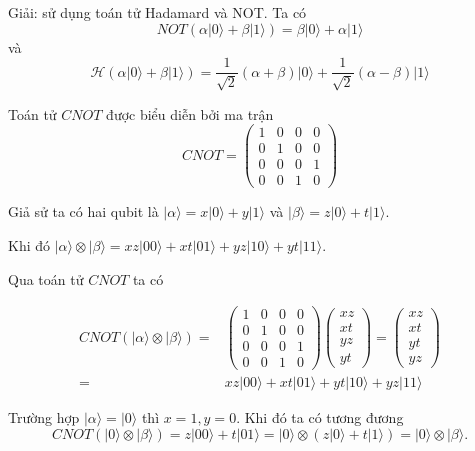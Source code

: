 Giải: sử dụng toán tử Hadamard và NOT. Ta có \[ NOT(\alpha \lvert 0 \rangle + \beta \lvert 1 \rangle) = \beta \lvert 0 \rangle + \alpha \lvert 1 \rangle\] và \[\mathcal{H} (\alpha \lvert 0 \rangle + \beta \lvert 1 \rangle) = \dfrac{1}{\sqrt{2}} (\alpha + \beta) \lvert 0 \rangle + \dfrac{1}{\sqrt{2}} (\alpha - \beta) \lvert 1 \rangle \]

Toán tử $CNOT$ được biểu diễn bởi ma trận \[ CNOT = \begin{pmatrix}
    1 & 0 & 0 & 0 \\ 0 & 1 & 0 & 0 \\ 0 & 0 & 0 & 1 \\ 0 & 0 & 1 & 0
\end{pmatrix}\]

Giả sử ta có hai qubit là $\lvert \alpha \rangle = x \lvert 0 \rangle + y \lvert 1 \rangle$ và $\lvert \beta \rangle = z \lvert 0 \rangle + t \lvert 1 \rangle$.

Khi đó $\lvert \alpha \rangle \otimes \lvert \beta \rangle = xz \lvert 00 \rangle + xt \lvert 01 \rangle + yz \lvert 10 \rangle + yt \lvert 11 \rangle$.

Qua toán tử $CNOT$ ta có

\begin{align*}
    CNOT (\lvert \alpha \rangle \otimes \lvert \beta \rangle) 
    = & \begin{pmatrix}
    1 & 0 & 0 & 0 \\ 0 & 1 & 0 & 0 \\ 0 & 0 & 0 & 1 \\ 0 & 0 & 1 & 0
    \end{pmatrix} \begin{pmatrix}
    xz \\ xt \\ yz \\ yt
    \end{pmatrix}
    = \begin{pmatrix}
    xz \\ xt \\ yt \\ yz
    \end{pmatrix} \\
    = & xz \lvert 00 \rangle + xt \lvert 01 \rangle + yt \lvert 10 \rangle + yz \lvert 11 \rangle
\end{align*}

Trường hợp $\lvert \alpha \rangle = \lvert 0 \rangle$ thì $x = 1, y = 0$. Khi đó ta có tương đương 
\begin{equation*}
    CNOT (\lvert 0 \rangle \otimes \lvert \beta \rangle) = z \lvert 00 \rangle + t \lvert 01 \rangle = \lvert 0 \rangle \otimes (z \lvert 0 \rangle + t \lvert 1 \rangle) = \lvert 0 \rangle \otimes \lvert \beta \rangle.
\end{equation*}

